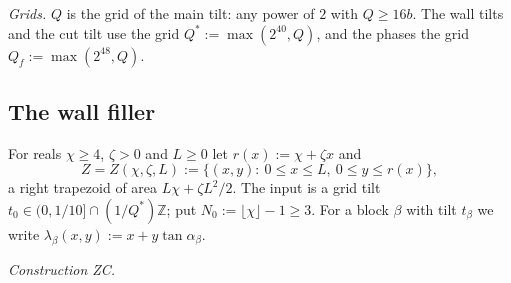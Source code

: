 \documentclass[11pt]{amsart}
\newcommand{\Z}{\mathbb Z}
\theoremstyle{definition}
\theoremstyle{remark}
\numberwithin{equation}{section}
\begin{document}
\emph{Grids.} $Q$ is the grid of the main tilt: any power of $2$ with $Q\ge16b$. The wall tilts and the cut tilt use the
grid $Q^*:=\max(2^{40},Q)$, and the phases the grid $Q_f:=\max(2^{48},Q)$.

\subsection{The wall filler}\label{ssec:wall}
For reals $\chi\ge4$, $\zeta>0$ and $L\ge0$ let $r(x):=\chi+\zeta x$ and
\[
Z=Z(\chi,\zeta,L):=\{(x,y):\ 0\le x\le L,\ 0\le y\le r(x)\},
\]
a right trapezoid of area $L\chi+\zeta L^2/2$. The input is a grid tilt $t_0\in(0,1/10]\cap(1/Q^*)\Z$; put
$N_0:=\lfloor\chi\rfloor-1\ge3$. For a block $\beta$ with tilt $t_\beta$ we write $\lambda_\beta(x,y):=x+y\tan\alpha_\beta$.

\emph{Construction ZC.}
\end{document}
